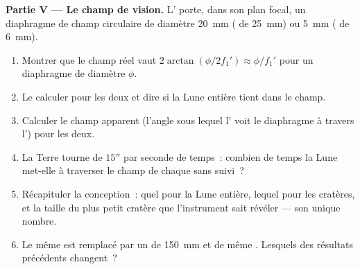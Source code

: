 \begin{problem}
\medskip
\noindent\textbf{Partie V --- Le champ de vision.}
L' porte, dans son plan focal, un diaphragme de champ circulaire
de diamètre \qty{20}{mm} ( de \qty{25}{mm}) ou \qty{5}{mm}
( de \qty{6}{mm}).
\begin{enumerate}[resume]
  \item Montrer que le champ réel vaut $2\arctan(\phi/2f_1')
        \approx \phi/f_1'$ pour un diaphragme de diamètre $\phi$.
  \item Le calculer pour les deux  et dire si la Lune entière
        tient dans le champ.
  \item Calculer le champ apparent (l'angle sous lequel l' voit le
        diaphragme à travers l') pour les deux.
  \item La Terre tourne de $15''$ par seconde de temps~: combien de
        temps la Lune met-elle à traverser le champ de chaque 
        sans suivi~?
  \item Récapituler la conception~: quel  pour la Lune entière,
        lequel pour les cratères, et la taille du plus petit cratère que
        l'instrument sait révéler --- son unique nombre.
  \item Le même  est remplacé par un  de
        \qty{150}{mm} et de même . Lesquels des résultats
        précédents changent~?
\end{enumerate}
\end{problem}

